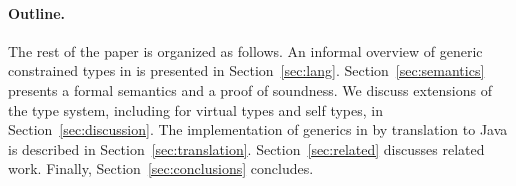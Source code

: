 \paragraph{Outline.}

The rest of the paper is organized as follows.
%
An informal overview of generic constrained types in \Xten{}
is presented in
Section~\ref{sec:lang}.  
%
Section~\ref{sec:semantics} presents a formal semantics and a
proof of soundness.
%
We discuss extensions of the type system, including for
virtual types and self types, in
Section~\ref{sec:discussion}.
%
The implementation of generics in \Xten{} by translation to Java is described in 
Section~\ref{sec:translation}.
%
Section~\ref{sec:related} discusses related work.
%
Finally, Section~\ref{sec:conclusions} concludes.

